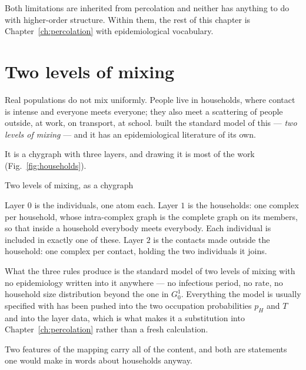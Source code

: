 Both limitations are inherited from percolation and neither has anything to do
with higher-order structure. Within them, the rest of this chapter is
Chapter~\ref{ch:percolation} with epidemiological vocabulary.

\section{Two levels of mixing}
\label{sec:twolevels}

Real populations do not mix uniformly. People live in households, where contact
is intense and everyone meets everyone; they also meet a scattering of people
outside, at work, on transport, at school. \citet{ball1997,ball2010} built
the standard model of this --- \emph{two levels
of mixing} --- and it has an epidemiological literature of its own.

It is a chygraph with three layers, and drawing it is most of the work
(Fig.~\ref{fig:households}).

\begin{model}{Two levels of mixing, as a chygraph}
\begin{rules}
 Layer $0$ is the individuals, one atom each.
 Layer $1$ is the households: one complex per household, whose
intra-complex graph is the complete graph on its members, so that inside a
household everybody meets everybody. Each individual is included in exactly one
of these.
 Layer $2$ is the contacts made outside the household:
one complex per contact, holding the two individuals it joins.
\end{rules}
\end{model}

What the three rules produce is the standard model of two levels of mixing with
no epidemiology written into it anywhere --- no infectious period, no rate, no
household size distribution beyond the one in $G^{1}_{0}$. Everything the model
is usually specified with has been pushed into the two occupation probabilities
$p_{H}$ and $T$ and into the layer data, which is what makes it a substitution
into Chapter~\ref{ch:percolation} rather than a fresh calculation.

Two features of the mapping carry all of the content, and both are statements
one would make in words about households anyway.

